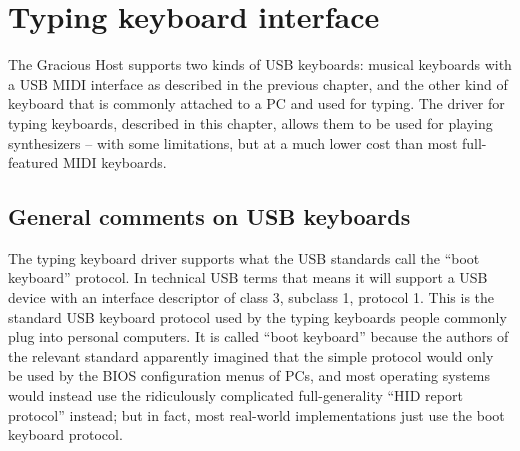 
%
%
%
%
%
%

\newcommand{\myFlFl}{\raisebox{0.2ex}{\musDoubleFlat}}
\newcommand{\myFl}{\raisebox{0.2ex}{\musFlat}}
\newcommand{\mySh}{\raisebox{0.4ex}{\musSharp}}
\newcommand{\myShSh}{\raisebox{0.4ex}{\musDoubleSharp}}

\chapter{Typing keyboard interface}

The Gracious Host supports two kinds of USB keyboards:  musical keyboards
with a USB MIDI interface as described in the previous chapter, and the
other kind of keyboard that is commonly attached to a PC and used for
typing.  The driver for typing keyboards, described in this chapter, allows
them to be used for playing synthesizers -- with some limitations, but at a
much lower cost than most full-featured MIDI keyboards.


\section{General comments on USB keyboards}

The typing keyboard driver supports what the USB standards call the ``boot
keyboard'' protocol.  In technical USB terms that means it will support a
USB device with an interface descriptor of class 3, subclass 1, protocol 1. 
This is the standard USB keyboard protocol used by the typing keyboards
people commonly plug into personal computers.  It is called ``boot
keyboard'' because the authors of the relevant standard apparently imagined
that the simple protocol would only be used by the BIOS configuration menus
of PCs, and most operating systems would instead use the ridiculously
complicated full-generality ``HID report protocol'' instead; but in fact,
most real-world implementations just use the boot keyboard protocol.


